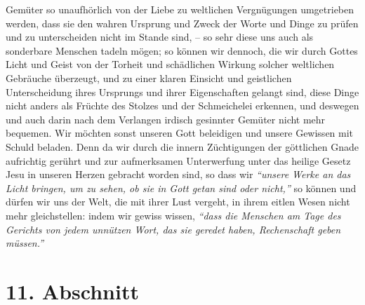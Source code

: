 Gemüter so unaufhörlich von der Liebe zu weltlichen Vergnügungen umgetrieben
werden, dass sie den wahren Ursprung und Zweck der Worte und Dinge zu prüfen und
zu unterscheiden nicht im Stande sind, -- so sehr diese uns auch als sonderbare
Menschen tadeln mögen; so können wir dennoch, die wir durch Gottes Licht und
Geist von der Torheit und schädlichen Wirkung solcher weltlichen Gebräuche
überzeugt, und zu einer klaren Einsicht und geistlichen Unterscheidung ihres
Ursprungs und ihrer Eigenschaften gelangt sind, diese Dinge nicht anders als
Früchte des Stolzes und der Schmeichelei erkennen, und deswegen und auch darin
nach dem Verlangen irdisch gesinnter Gemüter nicht mehr bequemen. Wir möchten
sonst unseren Gott beleidigen und unsere Gewissen mit Schuld beladen. Denn da
wir durch die innern Züchtigungen der göttlichen
Gnade aufrichtig gerührt und zur
aufmerksamen Unterwerfung unter das heilige Gesetz Jesu in unseren
Herzen
gebracht worden sind, so dass wir
\textit{"`unsere Werke an das Licht bringen, um zu
sehen, ob sie in Gott getan sind oder nicht,"'}
so können und dürfen wir uns der Welt, die mit ihrer Lust vergeht, in ihrem
eitlen
Wesen nicht mehr gleichstellen: indem wir gewiss wissen,
\textit{"`dass die Menschen am
Tage des Gerichts von jedem unnützen Wort, das sie geredet haben, Rechenschaft
geben müssen."'}

\section{11. Abschnitt} \label{kap10_ab11}

